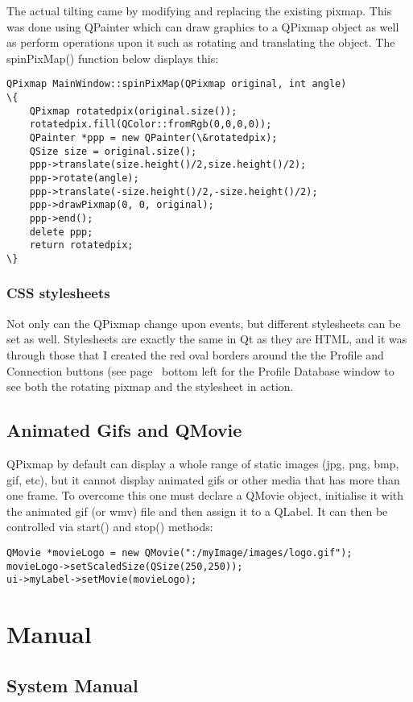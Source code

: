 The actual tilting came by modifying and replacing the existing pixmap. This was done using QPainter which can draw graphics to a QPixmap object as well as perform operations upon it such as rotating and translating the object. The spinPixMap() function below displays this:
\begin{lstlisting}
QPixmap MainWindow::spinPixMap(QPixmap original, int angle)
\{
    QPixmap rotatedpix(original.size());
    rotatedpix.fill(QColor::fromRgb(0,0,0,0));
    QPainter *ppp = new QPainter(\&rotatedpix);
    QSize size = original.size();
    ppp->translate(size.height()/2,size.height()/2);
    ppp->rotate(angle);
    ppp->translate(-size.height()/2,-size.height()/2);
    ppp->drawPixmap(0, 0, original);
    ppp->end();
    delete ppp;
    return rotatedpix;
\}
\end{lstlisting}

\subsubsection{CSS stylesheets}
Not only can the QPixmap change upon events, but different stylesheets can be set as well. Stylesheets are exactly the same in Qt as they are HTML, and it was through those that I created the red oval borders around the the Profile and Connection buttons (see page~\pageref{guimap} bottom left for the Profile Database window to see both the rotating pixmap and the stylesheet in action.

\subsection{Animated Gifs and QMovie}
QPixmap by default can display a whole range of static images (jpg, png, bmp, gif, etc), but it cannot display animated gifs or other media that has more than one frame. To overcome this one must declare a QMovie object, initialise it with the animated gif (or wmv) file and then assign it to a QLabel. It can then be controlled via start() and stop() methods:
\begin{lstlisting}
QMovie *movieLogo = new QMovie(":/myImage/images/logo.gif");
movieLogo->setScaledSize(QSize(250,250));
ui->myLabel->setMovie(movieLogo);
\end{lstlisting}

\section{Manual}
\subsection{System Manual}

